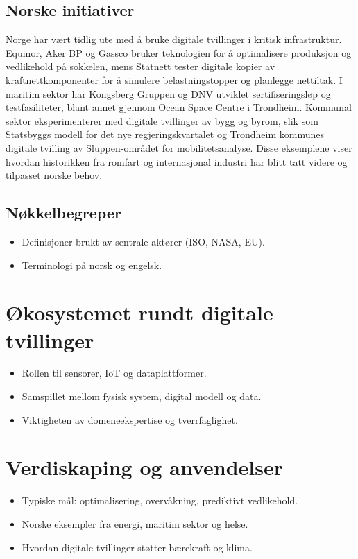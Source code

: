 \subsection{Norske initiativer}
Norge har vært tidlig ute med å bruke digitale tvillinger i kritisk infrastruktur. Equinor, Aker BP og Gassco bruker teknologien for å optimalisere produksjon og vedlikehold på sokkelen, mens Statnett tester digitale kopier av kraftnettkomponenter for å simulere belastningstopper og planlegge nettiltak. I maritim sektor har Kongsberg Gruppen og DNV utviklet sertifiseringsløp og testfasiliteter, blant annet gjennom Ocean Space Centre i Trondheim. Kommunal sektor eksperimenterer med digitale tvillinger av bygg og byrom, slik som Statsbyggs modell for det nye regjeringskvartalet og Trondheim kommunes digitale tvilling av Sluppen-området for mobilitetsanalyse. Disse eksemplene viser hvordan historikken fra romfart og internasjonal industri har blitt tatt videre og tilpasset norske behov.

\subsection{Nøkkelbegreper}
\begin{itemize}
    \item Definisjoner brukt av sentrale aktører (ISO, NASA, EU).
    \item Terminologi på norsk og engelsk.
\end{itemize}

\section{Økosystemet rundt digitale tvillinger}
\begin{itemize}
    \item Rollen til sensorer, IoT og dataplattformer.
    \item Samspillet mellom fysisk system, digital modell og data.
    \item Viktigheten av domeneekspertise og tverrfaglighet.
\end{itemize}

\section{Verdiskaping og anvendelser}
\begin{itemize}
    \item Typiske mål: optimalisering, overvåkning, prediktivt vedlikehold.
    \item Norske eksempler fra energi, maritim sektor og helse.
    \item Hvordan digitale tvillinger støtter bærekraft og klima.
\end{itemize}

